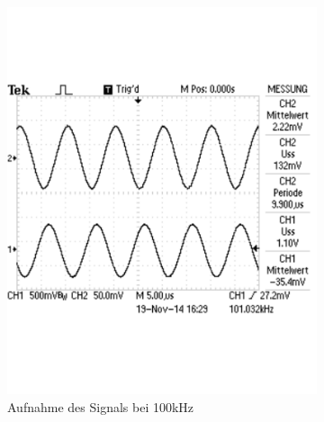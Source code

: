 \documentclass[12pt,a4paper]{article}
\begin{document}
\begin{figure}[H]
\begin{subfigure}[b]{0.28\textwidth}
                \includegraphics[width=\textwidth , scale = 0.4]{2_4_10_100k.pdf}
                \caption[Aufnahme des Signals bei 100kHz]{Aufnahme des Signals bei 100kHz}
                \label{fig:2_4_10_100k}
        \end{subfigure}
        \hfill
        \begin{subfigure}[b]{0.28\textwidth}

\end{subfigure}
\end{figure}
\end{document}
